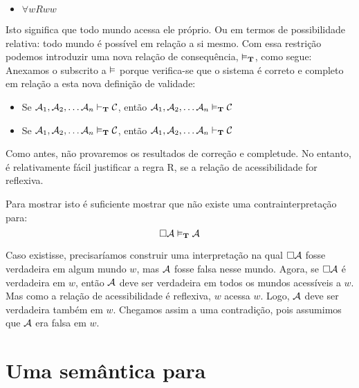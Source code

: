 \begin{itemize}
	\item $\forall wRww$
\end{itemize}
Isto significa que todo mundo acessa ele próprio. Ou em termos de possibilidade relativa: todo mundo é possível em relação a si mesmo. Com   essa restrição podemos introduzir uma nova relação de consequência, $\vDash_{\mathbf{T}}$, como segue:
Anexamos o subscrito \mlT{}  a $\vDash$ porque verifica-se que o sistema \mlT{} é correto e completo em relação a esta nova definição de validade:
\begin{itemize}
	\item Se $\mathcal{A}_1,\mathcal{A}_2, \dots \mathcal{A}_n\vdash_{\mathbf{T}}\mathcal{C}$, então $\mathcal{A}_1,\mathcal{A}_2, \dots \mathcal{A}_n\vDash_{\mathbf{T}}\mathcal{C}$
	\item Se $\mathcal{A}_1,\mathcal{A}_2, \dots \mathcal{A}_n\vDash_{\mathbf{T}}\mathcal{C}$, então $\mathcal{A}_1,\mathcal{A}_2, \dots \mathcal{A}_n\vdash_{\mathbf{T}}\mathcal{C}$
\end{itemize}
Como antes, não provaremos os resultados de correção e completude. No entanto, é relativamente fácil  justificar a regra  R\mlT, se a relação de acessibilidade for 
reflexiva.

Para mostrar isto é suficiente mostrar que não existe uma  contrainterpretação para:
\[
	\Box \mathcal{A}\vDash_{\mathbf{T}} \mathcal{A}
\]
 
Caso existisse,  precisaríamos construir  uma interpretação  na qual $\Box \mathcal{A}$ fosse verdadeira em algum  mundo  $w$, mas $\mathcal{A}$ fosse falsa nesse mundo. Agora, se $\Box \mathcal{A}$ é verdadeira em $w$, então $\mathcal{A}$ deve ser verdadeira em todos os mundos acessíveis a $w$. Mas como a relação de acessibilidade é reflexiva, $w$ acessa $w$. Logo, $\mathcal{A}$ deve ser verdadeira também em $w$. 
Chegamos assim a uma contradição,  pois assumimos que
  $\mathcal{A}$ era falsa em $w$. 

\section{Uma semântica para \mlSfour}
\label{SemanticsS4}

